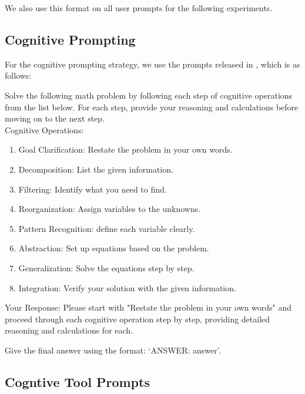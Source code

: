 We also use this format on all user prompts for the following experiments.


\subsection{Cognitive Prompting}

For the cognitive prompting strategy, we use the prompts released in \cite{Kramer2024}, which is as follows:

\begin{tcolorbox}[
    colback=gray!10,
    colframe=black,
    arc=4pt,
    boxrule=1pt,
    title=\textbf{Cognitive Prompting (prompt)},
    fonttitle=\bfseries,
    enhanced,
    left=4pt,
    right=4pt,
    top=4pt,
    bottom=4pt,
    breakable
]
Solve the following math problem by following each step of
cognitive operations from the list below. For each step, provide your
reasoning and calculations before moving on to the next step.\\

Cognitive Operations:
\begin{enumerate}[left=0pt, ]
    \item Goal Clarification: Restate the problem in your own words.
    \item Decomposition: List the given information.
    \item Filtering: Identify what you need to find.
    \item Reorganization: Assign variables to the unknowns.
    \item Pattern Recognition: define each variable clearly.
    \item Abstraction: Set up equations based on the problem.
    \item Generalization: Solve the equations step by step.
    \item Integration: Verify your solution with the given information.
\end{enumerate}

Your Response: Please start with "Restate the problem in your
own words" and proceed through each cognitive operation step by
step, providing detailed reasoning and calculations for each.

Give the final answer using the format: `ANSWER: answer'.
\end{tcolorbox}

\subsection{Cogntive Tool Prompts}

